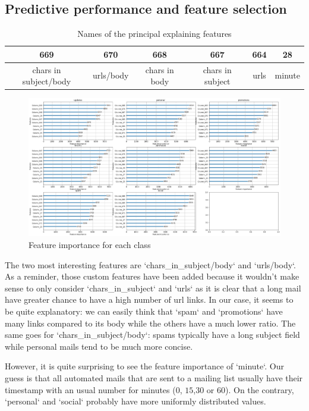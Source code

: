 \documentclass{article}
\begin{document}
\subsection{Predictive performance and feature selection}

\begin{table}[h!]
\begin{center}
 \begin{tabular}{|c | c | c | c | c | c |} 
 \hline
  669 & 670 & 668 & 667 & 664 & 28 \\ 
  \hline
  chars in subject/body & urls/body & chars in body & chars in subject & urls & minute \\
  \hline
\end{tabular}
\end{center}
\caption{Names of the principal explaining features}
\end{table}



\begin{figure}[h]
\centering
\includegraphics[scale=0.4]{Capture.PNG}
\caption{Feature importance for each class}
\label{fig:feature_importance}
\end{figure}

\begin{markdown}



The two most interesting features are `chars_in_subject/body` and `urls/body`. As a reminder, those custom features have been added because it wouldn't make sense to only consider `chars_in_subject` and `urls` as it is clear that a long mail have greater chance to have a high number of url links. In our case, it seems to be quite explanatory: we can easily think that `spam` and `promotions` have many links compared to its body while the others have a much lower ratio. The same goes for `chars_in_subject/body`: spams typically have a long subject field while personal mails tend to be much more concise.

However, it is quite surprising to see the feature importance of `minute`. Our guess is that all automated mails that are sent to a mailing list usually have their timestamp with an usual number for minutes ($0$, $15$,$30$ or $60$). On the contrary, `personal` and `social` probably have more uniformly distributed values.


\end{markdown}
\end{document}
